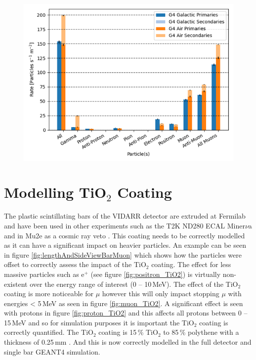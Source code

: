 \begin{figure}[!h]
 \centering
 \includegraphics[width=0.8\linewidth]{Chapter4/Figs/Raster/CryPlots/CRY_rates.png}
 \label{fig:CRY_rates}
\end{figure}

\section{Modelling TiO$_2$ Coating}
The plastic scintillating bars of the VIDARR detector are extruded at Fermilab and have been used in other experiments such as the T2K ND280 ECAL \cite{Allan_2013} Miner$\nu$a \cite{aliaga2014design} and in Mu2e as a cosmic ray veto \cite{Pla-Dalmau2014}. This coating needs to be correctly modelled as it can have a significant impact on heavier particles. An example can be seen in figure \ref{fig:lengthAndSideViewBarMuon} which shows how the particles were offset to correctly assess the impact of the TiO$_2$ coating. The effect for less massive particles such as e$^+$ (see figure \ref{fig:positron_TiO2}) is virtually non-existent over the energy range of interest (0 -- 10\,MeV). The effect of the TiO$_2$ coating is more noticeable for $\mu$ however this will only impact stopping $\mu$ with energies < 5\,MeV as seen in figure \ref{fig:muon_TiO2}. A significant effect is seen with protons in figure \ref{fig:proton_TiO2} and this affects all protons between 0 -- 15\,MeV and so for simulation purposes it is important the TiO$_2$ coating is correctly quantified. The TiO$_2$ coating is 15\,\% TiO$_2$ to 85\,\% polythene \cite{aliaga2014design} \cite{Pla-Dalmau2014} with a thickness of 0.25\,mm \cite{Pla-Dalmau2014}. And this is now correctly modelled in the full detector and single bar GEANT4 simulation.

